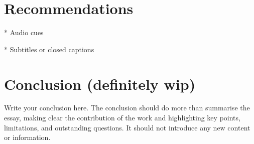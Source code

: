 \documentclass{scrartcl}
\begin{document}
\section{Recommendations}

* Audio cues

* Subtitles or closed captions

\section{Conclusion (definitely wip)}

Write your conclusion here. The conclusion should do more than summarise the essay, making clear the contribution of the work and highlighting key points, limitations, and outstanding questions. It should not introduce any new content or information.



\end{document}
